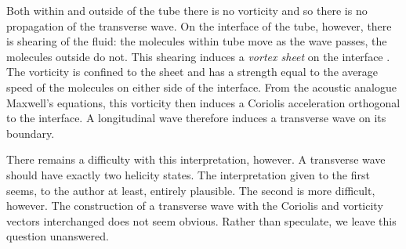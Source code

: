 \documentclass[10pt, fleqn,draft,showtrims,oldfontcommands]{article} %
\newcommand{\eqnref}[1]{\ref{eqn:#1}}
\newcommand{\figref}[1]{Figure~\ref{fig:#1}}
\newcommand{\del}{\nabla}
\newcommand{\vdel}{ \mbox{\boldmath $\del$}}
\newcommand{\vE}{\vect E}
\newcommand{\vB}{\vect B}
\newcommand{\vect}[1]{\mathbf{#1}}
\begin{document}
Both within and outside of the tube  there is no vorticity and so there is no propagation of the transverse wave.
On the interface of the tube, however, there is shearing of the fluid:
the molecules  within tube move as the wave passes, the molecules outside do not.
This shearing induces a {\em vortex sheet} on the interface \cite{Howe1998}.
The vorticity is confined to the sheet 
and has a strength equal to the average speed of the molecules on either side of the interface.
From the acoustic analogue Maxwell's equations, this vorticity then induces a Coriolis acceleration orthogonal to the interface.
A longitudinal wave therefore  induces a transverse wave on its boundary.

There remains a difficulty with this interpretation, however.
A transverse wave should have exactly two helicity states.
The interpretation given to the first seems, to the author at least, entirely plausible.
The second is more difficult, however.
The construction of a transverse wave with the Coriolis and vorticity vectors interchanged does not seem obvious.
Rather than speculate, 
we leave this question unanswered.








\end{document}
